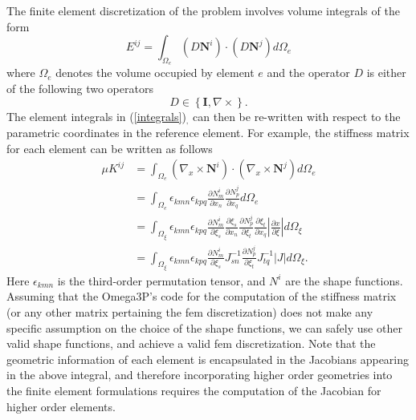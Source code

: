 \documentclass[review,12pt]{elsarticle_summary_report}
\newcommand{\pr}[1]{\left( #1 \right)}
\newcommand{\cbr}[1]{\left\lbrace #1 \right\rbrace}
\newcommand{\abs}[1]{\left | #1 \right |}
\newcommand{\mref}[2]{(#1)$_{\text{#2}}$}
\begin{document}
The finite element discretization of the problem involves volume integrals of the form \cite{LeeLi_09}
\begin{equation}
  E^{ij} =  \int _{\Omega _e} \pr{D \textbf{N}^i} \cdot \pr{D \textbf{N}^j} d\Omega _e	
  \label{integrals}
\end{equation}
where $\Omega _e$ denotes the volume occupied by element $e$ and the operator $D$ is either of the following two operators 
\begin{equation}
  D \in \cbr{\textbf{I}, \nabla \times }.
\end{equation}
The element integrals in \mref{\ref{integrals}}, can then be re-written with respect to the parametric coordinates in the reference element. For example, the stiffness matrix for each element can be written as follows
\begin{equation}
\begin{aligned}
\mu  K^{ij}	&= \int _{\Omega _e} \pr{\nabla _x \times \textbf{N}^i} \cdot \pr{\nabla _x \times \textbf{N}^j} d\Omega _e \\
  &= \int _{\Omega _e} \epsilon _{kmn} \epsilon_{kpq} \frac{\partial N^i_m}{\partial x_n} \frac{\partial N^j_p}{\partial x_q}   d\Omega _e \\
  &= \int _{\Omega _\xi} \epsilon _{kmn} \epsilon_{kpq} \frac{\partial N^i_m}{\partial \xi_s} \frac{\partial \xi_s}{\partial x_n}  \frac{\partial N^j_p}{\partial \xi_t}  \frac{\partial \xi_t}{\partial x_q} \abs{\frac{\partial x}{\partial \xi}  } d\Omega _\xi \\
  &= \int _{\Omega _\xi} \epsilon _{kmn} \epsilon_{kpq} \frac{\partial N^i_m}{\partial \xi_s} J^{-1}_{sn}  \frac{\partial N^j_p}{\partial \xi_t}  J^{-1}_{tq} \abs{J} d\Omega _\xi.
\end{aligned}
\end{equation}
Here $\epsilon_{kmn}$ is the third-order permutation tensor, and $N^i$ are the shape functions. Assuming that the Omega3P's code for the computation of the stiffness matrix (or any other matrix pertaining the fem discretization) does not make any specific assumption on the choice of the shape functions, we can safely use other valid shape functions, and  achieve a valid fem discretization. Note that the geometric information of each element is encapsulated in the Jacobians appearing in the above integral, and therefore incorporating higher order geometries into the finite element formulations requires the computation of the Jacobian for higher order elements.  
\end{document}
